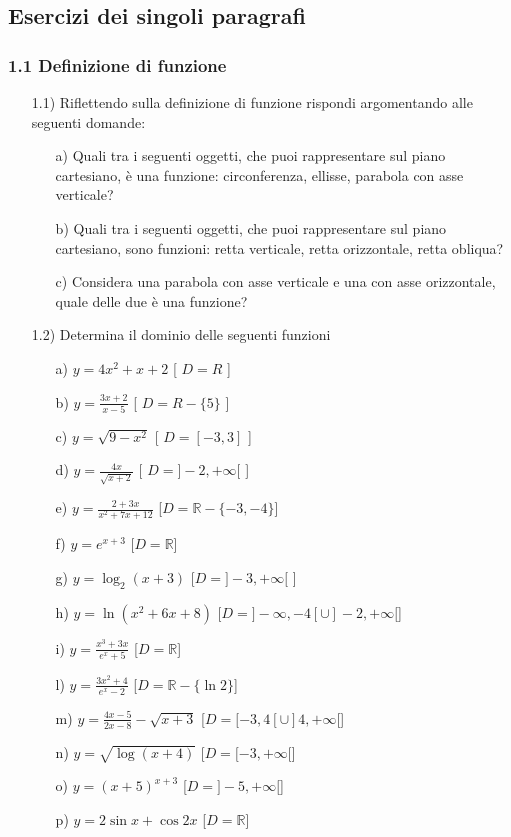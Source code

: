   \subsection{Esercizi dei singoli paragrafi}
  \subsubsection*{1.1 Definizione di funzione}
  \begin{itemize}
  \item[1.1)] Riflettendo sulla definizione di 
funzione rispondi argomentando alle seguenti domande:
  \begin{itemize}
  \item[a)] Quali tra i 
seguenti oggetti, che puoi rappresentare sul piano cartesiano, è una 
funzione: circonferenza, ellisse, parabola con asse verticale?
  \item[b)] Quali tra i 
seguenti oggetti, che puoi rappresentare sul piano cartesiano, sono funzioni: 
retta verticale, retta orizzontale, retta obliqua?
  \item[c)] Considera una 
parabola con asse verticale e una con asse orizzontale, quale delle due è una 
funzione?
  \end{itemize}
  \item[1.2)] Determina il dominio delle 
seguenti funzioni
  \begin{itemize}
  \item[a)] $y= 4x^2+x+2$   
   \hfill  [ $D=R$ ]
  \item[b)] 
$y=\frac{3x+2}{x-5}$   \hfill   
   [ $D=R-\{5\}$ ]
  \item[c)] $y=\sqrt{9-x^2}   $ 
   \hfill   [ $D=[-3, 3]$ ]
  \item[d)] 
$y=\frac{4x}{\sqrt{x+2}}  $  \hfill   
   [ $D=]-2,+\infty[$ ]
  \item[e)] 
$y=\frac{2+3x}{x^2+7x+12}$   \hfill   
[$D=\mathbb{R}-\{-3,-4\}$]
  \item[f)] $y=e^{x+3}$\hfill   
   [$D=\mathbb{R}$]
  \item[g)] $y=\log_2(x+3)$  
\hfill  [$D=]-3, +\infty[$ ]
  \item [h)] $y=\ln(x^2+6x+8)$  
  \hfill   
[$D=]-\infty,-4[\cup]-2,+\infty[$]
  
\item[i)]$y=\frac{x^3+3x}{e^x+5}$\hfill   
  [$D=\mathbb{R}$]
  
\item[l)]$y=\frac{3x^2+4}{e^x-2}$   \hfill  
   [$D=\mathbb{R}-\{\ln2\}$]
  \item[m)] 
$y=\frac{4x-5}{2x-8}-\sqrt{x+3}$  \hfill  
[$D=[-3,4[\cup]4,+\infty[$]
  \item[n)]$y=\sqrt{\log(x+4)}$ 
   \hfill  [$D=[-3,+\infty[$]
  \item[o)]$y=(x+5)^{x+3}$  
   \hfill  [$D=]-5,+\infty[$]
  \item[p)] 
$y=2\sin{x}+\cos{2x}$   \hfill   
[$D=\mathbb{R}$]
  

\end{itemize}
\end{itemize}
